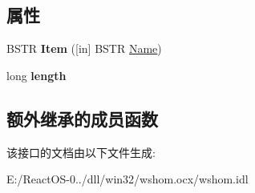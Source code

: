 \subsection*{属性}
\begin{DoxyCompactItemize}
\item 
\mbox{\label{interface_i_wsh_runtime_library_1_1_i_wsh_environment_a4c8ae96be1b66b31b8232d0f1b4f2c12}} 
B\+S\+TR {\bfseries Item} (\mbox{[}in\mbox{]} B\+S\+TR \hyperlink{struct_name_rec__}{Name})
\item 
\mbox{\label{interface_i_wsh_runtime_library_1_1_i_wsh_environment_a15322e2a7dba5fad271198ae177fc89b}} 
long {\bfseries length}
\end{DoxyCompactItemize}
\subsection*{额外继承的成员函数}


该接口的文档由以下文件生成\+:\begin{DoxyCompactItemize}
\item 
E\+:/\+React\+O\+S-\/0../dll/win32/wshom.\+ocx/wshom.\+idl\end{DoxyCompactItemize}
